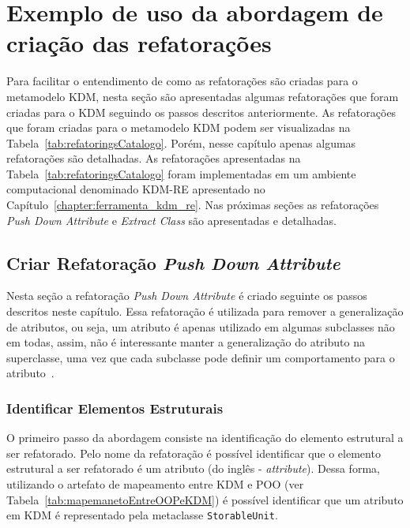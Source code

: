 \section{Exemplo de uso da abordagem de criação das refatorações}\label{sec:catalogo_refatoracao_kdm}

Para facilitar o entendimento de como as refatorações são criadas para o metamodelo KDM, nesta seção são apresentadas algumas refatorações que foram criadas para o KDM seguindo os passos descritos anteriormente. As refatorações que foram criadas para o metamodelo KDM podem ser visualizadas na Tabela~\ref{tab:refatoringsCatalogo}. Porém, nesse capítulo apenas algumas refatorações são detalhadas. As refatorações apresentadas na Tabela~\ref{tab:refatoringsCatalogo} foram implementadas em um ambiente computacional denominado KDM-RE apresentado no Capítulo~\ref{chapter:ferramenta_kdm_re}. Nas próximas seções as refatorações \textit{Push Down Attribute} e \textit{Extract Class} são apresentadas e detalhadas. %



		
\subsection{Criar Refatoração \textit{Push Down Attribute}}
Nesta seção a refatoração \textit{Push Down Attribute} é criado seguinte os passos descritos neste capítulo. Essa refatoração é utilizada para remover a generalização de atributos, ou seja, um atributo é apenas utilizado em algumas subclasses não em todas, assim, não é interessante manter a generalização do atributo na superclasse, uma vez que cada subclasse pode definir um comportamento para o atributo~\cite{Fowler1999}.


\subsubsection{Identificar Elementos Estruturais}
O primeiro passo da abordagem consiste na identificação do elemento estrutural a ser refatorado. Pelo nome da refatoração é possível identificar que o elemento estrutural a ser refatorado é um atributo (do inglês - \textit{attribute}). Dessa forma, utilizando o artefato de mapeamento entre KDM e POO (ver Tabela~\ref{tab:mapemanetoEntreOOPeKDM}) é possível identificar que um atributo em KDM é representado pela metaclasse \texttt{StorableUnit}.

